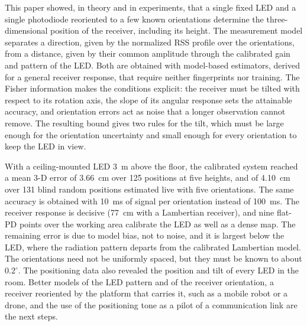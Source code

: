 This paper showed, in theory and in experiments, that a single fixed LED and a single photodiode reoriented to a few known orientations determine the three-dimensional position of the receiver, including its height. The measurement model separates a direction, given by the normalized RSS profile over the orientations, from a distance, given by their common amplitude through the calibrated gain and pattern of the LED. Both are obtained with model-based estimators, derived for a general receiver response, that require neither fingerprints nor training. The Fisher information makes the conditions explicit: the receiver must be tilted with respect to its rotation axis, the slope of its angular response sets the attainable accuracy, and orientation errors act as noise that a longer observation cannot remove. The resulting bound gives two rules for the tilt, which must be large enough for the orientation uncertainty and small enough for every orientation to keep the LED in view.

With a ceiling-mounted LED 3~m above the floor, the calibrated system reached a mean \mbox{3-D} error of 3.66~cm over 125 positions at five heights, and of 4.10~cm over 131 blind random positions estimated live with five orientations. The same accuracy is obtained with 10~ms of signal per orientation instead of 100~ms. The receiver response is decisive (77~cm with a Lambertian receiver), and nine flat-PD points over the working area calibrate the LED as well as a dense map. The remaining error is due to model bias, not to noise, and it is largest below the LED, where the radiation pattern departs from the calibrated Lambertian model. The orientations need not be uniformly spaced, but they must be known to about $0.2^\circ$. The positioning data also revealed the position and tilt of every LED in the room. Better models of the LED pattern and of the receiver orientation, a receiver reoriented by the platform that carries it, such as a mobile robot or a drone, and the use of the positioning tone as a pilot of a communication link are the next steps.
